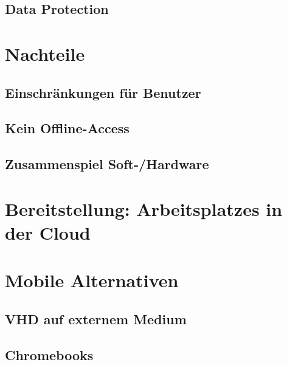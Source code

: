 \subsection{Data Protection}

\section{Nachteile}

\subsection{Einschränkungen für Benutzer}
\subsection{Kein Offline-Access}
\subsection{Zusammenspiel Soft-/Hardware}



\section{Bereitstellung: Arbeitsplatzes in der Cloud}



\section{Mobile Alternativen}

\subsection{VHD auf externem Medium}

\subsection{Chromebooks}


